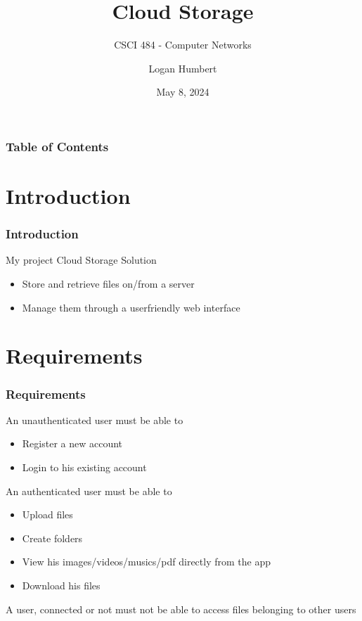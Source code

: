 \documentclass{beamer}
\title{Cloud Storage}
\subtitle{CSCI 484 - Computer Networks}
\author{Logan Humbert}
\institute{Colorado Mesa University}
\date{May 8, 2024}
\begin{document}
	\frame{\titlepage}
	
	\begin{frame}
		\frametitle{Table of Contents}
		\tableofcontents
	\end{frame}
	
	\section{Introduction}
	\begin{frame}
		\frametitle{Introduction}
		
		\begin{alertblock}{My project}
			Cloud Storage Solution
			\begin{itemize}
				\item Store and retrieve files on/from a server
				\item Manage them through a userfriendly web interface
			\end{itemize}
		\end{alertblock}
	\end{frame}
	
	\section{Requirements}
	\begin{frame}
		\frametitle{Requirements}
		
		\begin{alertblock}{An unauthenticated user must be able to}
			\begin{itemize}
				\item Register a new account
				\item Login to his existing account
			\end{itemize}
		\end{alertblock}
		
		\begin{alertblock}{An authenticated user must be able to}
			\begin{itemize}
				\item Upload files
				\item Create folders
				\item View his images/videos/musics/pdf directly from the app
				\item Download his files
			\end{itemize}
		\end{alertblock}
		
		A user, connected or not must not be able to access files belonging to other users
	\end{frame}
	
\end{document}
